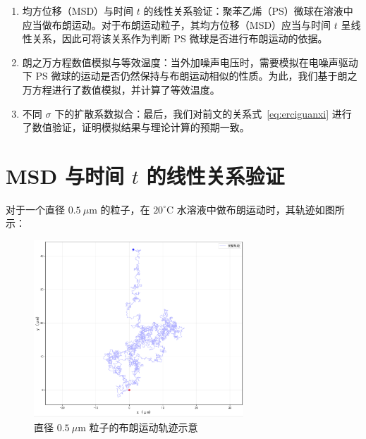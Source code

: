 \documentclass[a4paper]{report} %
\begin{document}
\begin{enumerate}
  \item 均方位移（MSD）与时间 $t$ 的线性关系验证：聚苯乙烯（PS）微球在溶液中应当做布朗运动。对于布朗运动粒子，其均方位移（MSD）应当与时间 $t$ 呈线性关系，因此可将该关系作为判断 PS 微球是否进行布朗运动的依据。

  \item 朗之万方程数值模拟与等效温度：当外加噪声电压时，需要模拟在电噪声驱动下 PS 微球的运动是否仍然保持与布朗运动相似的性质。为此，我们基于朗之万方程进行了数值模拟，并计算了等效温度。

  \item 不同 $\sigma$ 下的扩散系数拟合：最后，我们对前文的关系式~\eqref{eq:erciguanxi} 进行了数值验证，证明模拟结果与理论计算的预期一致。
\end{enumerate}
\newpage
\section{ MSD 与时间 $t$ 的线性关系验证}

对于一个直径 $0.5~\mu\text{m}$ 的粒子，在 $20^\circ$C 水溶液中做布朗运动时，其轨迹如图所示：
\begin{figure}[H]
  \centering
  \includegraphics[width=0.7\textwidth]{trajectory.png}
  \caption{直径 $0.5~\mu$m 粒子的布朗运动轨迹示意}
  \label{fig:trajectory}
\end{figure}
\end{document}
